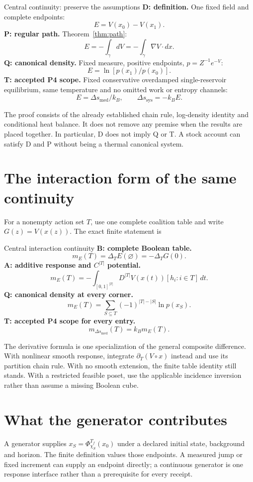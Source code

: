 \begin{lawbox}{Central continuity: preserve the assumptions}
\textbf{D: definition.} One fixed field and complete endpoints:
\[
 E=V(x_0)-V(x_1).
\]
\textbf{P: regular path.} Theorem~\ref{thm:path}:
\[
 E=-\int_\gamma dV=-\int_\gamma\nabla V\cdot dx.
\]
\textbf{Q: canonical density.} Fixed measure, positive endpoints, $p=Z^{-1}e^{-V}$:
\[
 E=\ln[p(x_1)/p(x_0)].
\]
\textbf{T: accepted P4 scope.} Fixed conservative overdamped single-reservoir equilibrium, same temperature and no omitted work or entropy channels:
\[
 E=\Delta s_{\mathrm{med}}/k_B,
 \qquad \Delta s_{\mathrm{sys}}=-k_BE.
\]
\end{lawbox}

The proof consists of the already established chain rule, log-density identity and conditional heat balance. It does not remove any premise when the results are placed together. In particular, D does not imply Q or T. A stock account can satisfy D and P without being a thermal canonical system.

\section{The interaction form of the same continuity}
For a nonempty action set $T$, use one complete coalition table and write $G(z)=V(x(z))$. The exact finite statement is
\begin{lawbox}{Central interaction continuity}
\textbf{B: complete Boolean table.}
\[
 m_E(T)=\Delta_TE(\varnothing)=-\Delta_TG(0).
\]
\textbf{A: additive response and $C^{|T|}$ potential.}
\[
 m_E(T)=-\int_{[0,1]^{|T|}}D^{|T|}V(x(t))[h_i:i\in T]\,dt.
\]
\textbf{Q: canonical density at every corner.}
\[
 m_E(T)=\sum_{S\subseteq T}(-1)^{|T|-|S|}\ln p(x_S).
\]
\textbf{T: accepted P4 scope for every entry.}
\[
 m_{\Delta s_{\mathrm{med}}}(T)=k_Bm_E(T).
\]
\end{lawbox}

The derivative formula is one specialization of the general composite difference. With nonlinear smooth response, integrate $\partial_T(V\circ x)$ instead and use its partition chain rule. With no smooth extension, the finite table identity still stands. With a restricted feasible poset, use the applicable incidence inversion rather than assume a missing Boolean cube.

\section{What the generator contributes}
A generator supplies $x_S=\Phi_{\chi_S}^{T_f}(x_0)$ under a declared initial state, background and horizon. The finite definition values those endpoints. A measured jump or fixed increment can supply an endpoint directly; a continuous generator is one response interface rather than a prerequisite for every receipt.

